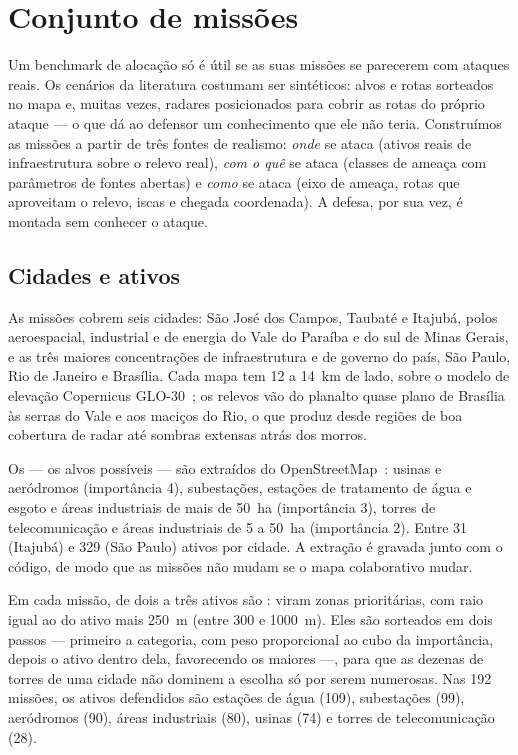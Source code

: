 \section{Conjunto de missões}\label{sec:dataset}

Um benchmark de alocação só é útil se as suas missões se parecerem com ataques reais. Os cenários da literatura costumam
ser sintéticos: alvos e rotas sorteados no mapa e, muitas vezes, radares posicionados para cobrir as rotas do próprio
ataque --- o que dá ao defensor um conhecimento que ele não teria. Construímos as missões a partir de três fontes de
realismo: \emph{onde} se ataca (ativos reais de infraestrutura sobre o relevo real), \emph{com o quê} se ataca (classes
de ameaça com parâmetros de fontes abertas) e \emph{como} se ataca (eixo de ameaça, rotas que aproveitam o relevo,
iscas e chegada coordenada). A defesa, por sua vez, é montada sem conhecer o ataque.

\subsection{Cidades e ativos}
As missões cobrem seis cidades: São José dos Campos, Taubaté e Itajubá, polos aeroespacial, industrial e de energia do
Vale do Paraíba e do sul de Minas Gerais, e as três maiores concentrações de infraestrutura e de governo do país, São
Paulo, Rio de Janeiro e Brasília. Cada mapa tem 12 a 14~km de lado, sobre o modelo de elevação Copernicus
GLO-30~\cite{copernicusDEM}; os relevos vão do planalto quase plano de Brasília às serras do Vale e aos maciços do Rio,
o que produz desde regiões de boa cobertura de radar até sombras extensas atrás dos morros.

Os  --- os alvos possíveis --- são extraídos do OpenStreetMap~\cite{osm}: usinas e aeródromos
(importância 4), subestações, estações de tratamento de água e esgoto e áreas industriais de mais de 50~ha (importância
3), torres de telecomunicação e áreas industriais de 5 a 50~ha (importância 2). Entre 31 (Itajubá) e 329 (São Paulo)
ativos por cidade. A extração é gravada junto com o código, de modo que as missões não mudam se o mapa colaborativo mudar.

Em cada missão, de dois a três ativos são : viram zonas prioritárias, com raio igual ao do ativo
mais 250~m (entre 300 e 1000~m). Eles são sorteados em dois passos --- primeiro a categoria, com peso proporcional ao
cubo da importância, depois o ativo dentro dela, favorecendo os maiores ---, para que as dezenas de torres de uma cidade
não dominem a escolha só por serem numerosas. Nas 192 missões, os ativos defendidos são estações de água (109),
subestações (99), aeródromos (90), áreas industriais (80), usinas (74) e torres de telecomunicação (28).

